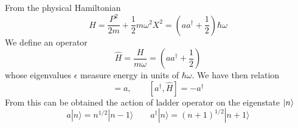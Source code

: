 \documentclass[../../../main.tex]{subfiles}
\begin{document}
From the physical Hamiltonian
\begin{equation*}
  H=\frac{P^2}{2m }+\frac{1 }{2 }m\omega^2 X^2=\left( a a ^\dagger+\frac{1 }{2 } \right)\hbar \omega
\end{equation*}
We define an operator
\begin{equation*}
  \hat{H }=\frac{H }{m\omega }=\left( a a ^\dagger+\frac{1 }{2 } \right)
\end{equation*}
whose eigenvalues $\epsilon$ measure energy in units of $\hbar \omega$.
We have then relation
\begin{equation*}
  [a,\hat{H } ]=a,\qquad [a ^\dagger,\hat{H }]=-a ^\dagger
\end{equation*}
From this can be obtained the action of ladder operator on the eigenstate $\ket{n}$
\begin{equation*}
  a |n\rangle = n^{1/2} |n-1\rangle\qquad a^{\dagger} |n\rangle = (n+1)^{1/2} |n+1\rangle
\end{equation*}
\end{document}
